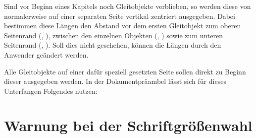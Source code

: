 \begin{Entity}{}
\begin{Declaration}
  {}
\begin{Declaration}
  {}
\begin{Declaration}
  {}
\begin{Declaration}
  {}
\begin{Declaration}
  {}
\begin{Declaration}
  {}
\printdeclarationlist[Längen]

Sind vor Beginn eines Kapitels noch Gleitobjekte verblieben, so werden diese 
von  normalerweise auf einer separaten Seite vertikal zentriert 
ausgegeben. Dabei bestimmen diese Längen den Abstand vor dem ersten Gleitobjekt 
zum oberen Seitenrand (, ), zwischen den 
einzelnen Objekten (, ) sowie zum unteren 
Seitenrand (, ). Soll dies nicht 
geschehen, können die Längen durch den Anwender geändert werden.
\end{Declaration}
\end{Declaration}
\end{Declaration}
\end{Declaration}
\end{Declaration}
\end{Declaration}
%
\begin{Example}
Alle Gleitobjekte auf einer dafür speziell gesetzten Seite sollen direkt zu 
Beginn dieser ausgegeben werden. In der Dokumentpräambel lässt sich für dieses 
Unterfangen Folgendes nutzen:
\begin{Code}
\makeatletter
\setlength{\@fptop}{0pt}
\setlength{\@dblfptop}{0pt}%
\makeatother
\end{Code}
\end{Example}
\end{Entity}



\section{%
  Warnung bei der Schriftgrößenwahl%
  \label{sec:tips:fontsize}%
}

